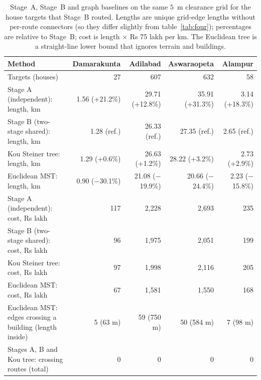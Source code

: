 \documentclass[10pt,a4paper,twocolumn]{article}
\begin{document}
\begin{table}[tbp]
\caption{Stage~A, Stage~B and graph baselines on the same $5$~m clearance grid for the house targets that Stage~B routed. Lengths are unique grid-edge lengths without per-route connectors (so they differ slightly from table~\ref{tab:four}); percentages are relative to Stage~B; cost is length $\times$ Rs 75 lakh per km. The Euclidean tree is a straight-line lower bound that ignores terrain and buildings.}
\label{tab:graphbase}
\centering
\scriptsize
\begin{tabular}{@{}lrrrr@{}}
\toprule
Method & Damarakunta & Adilabad & Aswaraopeta & Alampur\\
\midrule
Targets (houses) & 27 & 607 & 632 & 58\\
\midrule
Stage A (independent): length, km & 1.56 (+21.2\%) & 29.71 (+12.8\%) & 35.91 (+31.3\%) & 3.14 (+18.3\%)\\
Stage B (two-stage shared): length, km & 1.28 (ref.) & 26.33 (ref.) & 27.35 (ref.) & 2.65 (ref.)\\
Kou Steiner tree: length, km & 1.29 (+0.6\%) & 26.63 (+1.2\%) & 28.22 (+3.2\%) & 2.73 (+2.9\%)\\
Euclidean MST: length, km & 0.90 ($-$30.1\%) & 21.08 ($-$19.9\%) & 20.66 ($-$24.4\%) & 2.23 ($-$15.8\%)\\
\midrule
Stage A (independent): cost, Rs lakh & 117 & 2{,}228 & 2{,}693 & 235\\
Stage B (two-stage shared): cost, Rs lakh & 96 & 1{,}975 & 2{,}051 & 199\\
Kou Steiner tree: cost, Rs lakh & 97 & 1{,}998 & 2{,}116 & 205\\
Euclidean MST: cost, Rs lakh & 67 & 1{,}581 & 1{,}550 & 168\\
\midrule
Euclidean MST: edges crossing a building (length inside) & 5 (63 m) & 59 (750 m) & 50 (584 m) & 7 (98 m)\\
Stages A, B and Kou tree: crossing routes (total) & 0 & 0 & 0 & 0\\
\bottomrule
\end{tabular}
\end{table}
\end{document}
